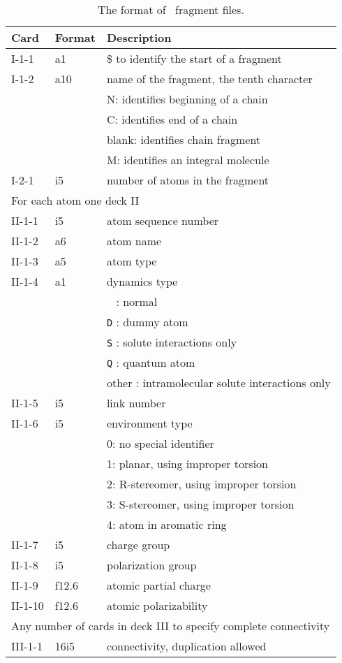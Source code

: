 \begin{table}[htbp]
\begin{center}
\begin{tabular}{lll}
\hline\hline
Card & Format & Description \\ \hline
I-1-1  & a1     & \$ to identify the start of a fragment \\ %
I-1-2  & a10    & name of the fragment, the tenth character\\
       &        & N: identifies beginning of a chain\\
       &        & C: identifies end of a chain\\
       &        & blank: identifies chain fragment\\
       &        & M: identifies an integral molecule\\
\hline
I-2-1  & i5     & number of atoms in the fragment\\ 
\hline
\multicolumn{3}{l}{For each atom one deck II} \\
\hline
II-1-1  & i5     & atom sequence number \\
II-1-2  & a6     & atom name \\
II-1-3  & a5     & atom type \\
II-1-4  & a1     & dynamics type\\
        &        & \verb+ + : normal\\
        &        & \verb+D+ : dummy atom\\
        &        & \verb+S+ : solute interactions only\\
        &        & \verb+Q+ : quantum atom\\
        &        & other : intramolecular solute interactions only\\
II-1-5  & i5     & link number\\
II-1-6  & i5     & environment type\\
        &        & 0: no special identifier\\
        &        & 1: planar, using improper torsion\\
        &        & 2: R-stereomer, using improper torsion\\
        &        & 3: S-stereomer, using improper torsion\\
        &        & 4: atom in aromatic ring\\
II-1-7  & i5     & charge group\\
II-1-8  & i5     & polarization group\\
II-1-9  & f12.6  & atomic partial charge\\
II-1-10 & f12.6  & atomic polarizability\\
\hline
\multicolumn{3}{l}{Any number of cards in deck III to specify complete 
connectivity} \\
\hline
III-1-1  & 16i5   & connectivity, duplication allowed\\ 
\hline\hline
\end{tabular}
\caption{The format of \nwargos\ fragment files.\label{tbl:nwafrag}}
\end{center}
\end{table}

